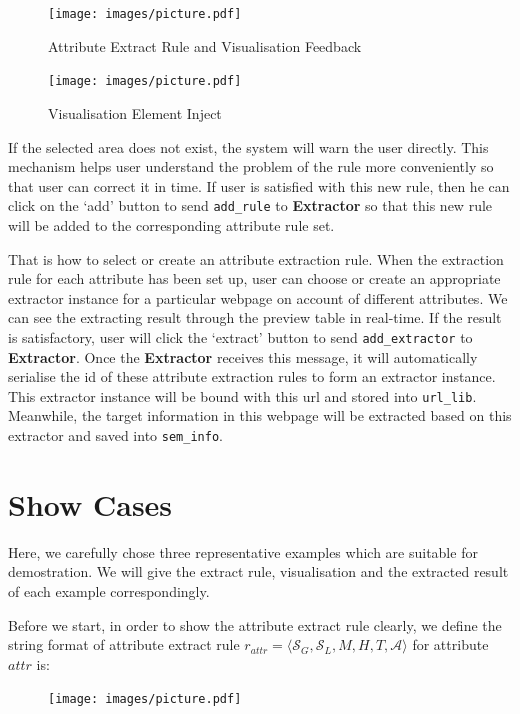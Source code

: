 \begin{figure}[htb!]
	\centering
	\texttt{[image: images/picture.pdf]}
	\caption{Attribute Extract Rule and Visualisation Feedback}\label{fig:ext:aer_vf}
\end{figure}

\begin{figure}[htb!]
	\centering
	\texttt{[image: images/picture.pdf]}
	\caption{Visualisation Element Inject}\label{fig:ext:ve_inject}
\end{figure}

If the selected area does not exist, the system will warn the user directly. This mechanism helps user understand the problem of the rule more conveniently so that user can correct it in time. If user is satisfied with this new rule, then he can click on the `add' button to send \texttt{add\_rule} to \textbf{Extractor} so that this new rule will be added to the corresponding attribute rule set.

That is how to select or create an attribute extraction rule. When the extraction rule for each attribute has been set up, user can choose or create an appropriate extractor instance for a particular webpage on account of different attributes. We can see the extracting result through the preview table in real-time. If the result is satisfactory, user will click the `extract' button to send \texttt{add\_extractor} to \textbf{Extractor}. Once the \textbf{Extractor} receives this message, it will automatically serialise the id of these attribute extraction rules to form an extractor instance. This extractor instance will be bound with this url and stored into \texttt{url\_lib}. Meanwhile, the target information in this webpage will be extracted based on this extractor and saved into \texttt{sem\_info}.

\section{Show Cases}
Here, we carefully chose three representative examples which are suitable for demostration. We will give the extract rule, visualisation and the extracted result of each example correspondingly.

Before we start, in order to show the attribute extract rule clearly, we define the string format of attribute extract rule $r_{attr} = \langle \mathcal{S}_G, \mathcal{S}_L,M, H, T, \mathcal{A} \rangle$ for attribute $attr$ is:
\begin{figure}[htb!]
	\centering
	\texttt{[image: images/picture.pdf]}
\end{figure}

